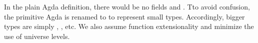 \begin{code}
\AgdaSymbol{)}\AgdaSpace{}%
\<%
\\
\>[.][@{}l@{}]\<[137I]%
\>[4]\AgdaSymbol{(}\AgdaFunction{Σ[}\AgdaSpace{}%
\AgdaSpace{}%
\AgdaSpace{}%
\AgdaSpace{}%
\AgdaFunction{]}\AgdaSpace{}%
\AgdaSymbol{(}\AgdaSpace{}%
\AgdaSpace{}%
\AgdaSpace{}%
\AgdaSymbol{))}\AgdaSpace{}%
\AgdaOperator{\AgdaInductiveConstructor{,}}\AgdaSpace{}%
\AgdaSpace{}%
\AgdaSpace{}%
\AgdaSpace{}%
\AgdaSpace{}%
\AgdaSpace{}%
\AgdaSpace{}%
\AgdaSymbol{)}\<%
\\
%
\>[2]\AgdaSymbol{;}\AgdaSpace{}%
\AgdaSpace{}%
\AgdaSymbol{=}\AgdaSpace{}%
\AgdaSpace{}%
\AgdaSpace{}%
\AgdaSymbol{(}\AgdaSpace{}%
\AgdaOperator{\AgdaInductiveConstructor{,}}\AgdaSpace{}%
\AgdaSymbol{)}\AgdaSpace{}%
\AgdaSpace{}%
\AgdaSpace{}%
\AgdaOperator{\AgdaInductiveConstructor{,}}\AgdaSpace{}%
\AgdaSpace{}%
\AgdaSpace{}%
\AgdaSpace{}%
\AgdaSpace{}%
\AgdaSymbol{(}\AgdaSpace{}%
\AgdaSymbol{)}\<%
\\
%
\>[2]\AgdaSymbol{;}\AgdaSpace{}%
\AgdaSpace{}%
\AgdaSymbol{=}\AgdaSpace{}%
\AgdaSpace{}%
\AgdaSpace{}%
\AgdaSymbol{(}\AgdaSpace{}%
\AgdaOperator{\AgdaInductiveConstructor{,}}\AgdaSpace{}%
\AgdaSymbol{)}\AgdaSpace{}%
\AgdaSpace{}%
\AgdaSpace{}%
\AgdaOperator{\AgdaInductiveConstructor{,}}\AgdaSpace{}%
\<%
\\
%
\>[2]\AgdaSymbol{;}\AgdaSpace{}%
\AgdaSpace{}%
\AgdaSymbol{=}\AgdaSpace{}%
\AgdaSpace{}%
\AgdaSpace{}%
\AgdaSpace{}%
\AgdaSpace{}%
\AgdaSymbol{(}\AgdaSpace{}%
\AgdaOperator{\AgdaInductiveConstructor{,}}\AgdaSpace{}%
\AgdaSymbol{)}\AgdaSpace{}%
\AgdaSpace{}%
\AgdaSpace{}%
\AgdaOperator{\AgdaInductiveConstructor{,}}\AgdaSpace{}%
\AgdaSpace{}%
\AgdaSpace{}%
\AgdaSpace{}%
\AgdaSpace{}%
\AgdaSymbol{(}\AgdaSpace{}%
\AgdaSymbol{(}\AgdaSpace{}%
\AgdaSymbol{))}\<%
\\
%
\>[2]\AgdaSymbol{\}}\<%
\end{code}

In the plain Agda definition, there would be no fields  and . Tto avoid confusion, the primitive Agda  is renamed to  to represent small types. Accordingly, bigger types are simply , , etc. We also assume function extensionality and minimize the use of universe levels.